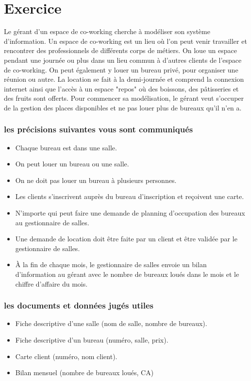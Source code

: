 \section*{Exercice}
Le gérant d'un espace de co-working cherche à modéliser son système d'information. Un espace de co-working est un lieu où l'on peut venir travailler et rencontrer des professionnels de différents corps de métiers. On loue un espace pendant une journée ou plus dans un lieu commun à d'autres clients de l'espace de co-working. On peut également y louer un bureau privé, pour organiser une réunion ou autre. La location se fait à la demi-journée et comprend la connexion internet ainsi que l'accès à un espace "repos" où des boissons, des pâtisseries et des fruits sont offerts.
Pour commencer sa modélisation, le gérant veut s'occuper de la gestion des places disponibles et ne pas louer plus de bureaux qu'il n'en a.


\subsubsection*{les précisions suivantes vous sont communiqués}
\begin{itemize}
    \item Chaque bureau est dans une salle.
    \item On peut louer un bureau ou une salle.
    \item On ne doit pas louer un bureau à plusieurs personnes.
    \item Les clients s'inscrivent auprès du bureau d'inscription et reçoivent une carte.
    \item N'importe qui peut faire une demande de planning d'occupation des bureaux au gestionnaire de salles.
    \item Une demande de location doit être faite par un client et être validée par le gestionnaire de salles.
    \item À la fin de chaque mois, le gestionnaire de salles envoie un bilan d'information au gérant avec le nombre de bureaux loués dans le mois et le chiffre d'affaire du mois.
\end{itemize}

\subsubsection*{les documents et données jugés utiles}
\begin{itemize}
    \item Fiche descriptive d'une salle (nom de salle, nombre de bureaux).
    \item Fiche descriptive d'un bureau (numéro, salle, prix).
    \item Carte client (numéro, nom client).
    \item Bilan mensuel (nombre de bureaux loués, CA)
\end{itemize}

